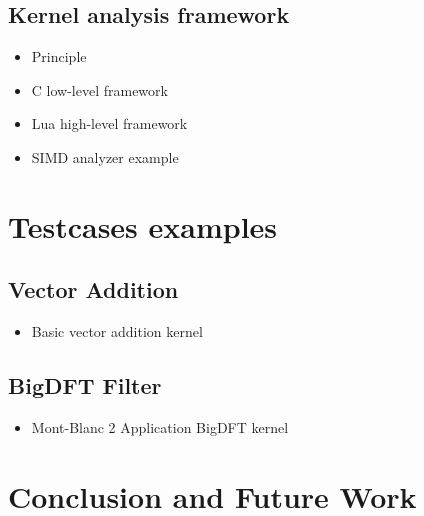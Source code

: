 \documentclass[11pt, a4paper, twoside]{montblanc2}
\begin{document}
\subsection{Kernel analysis framework}

\begin{itemize}
  \item Principle
  \item C low-level framework
  \item Lua high-level framework
  \item SIMD analyzer example
\end{itemize}

\section{Testcases examples}

  \subsection{Vector Addition}
\begin{itemize}
  \item Basic vector addition kernel
\end{itemize}

  \subsection{BigDFT Filter}
\begin{itemize}
  \item Mont-Blanc 2 Application BigDFT kernel
\end{itemize}

\section{Conclusion and Future Work}



\end{document}
